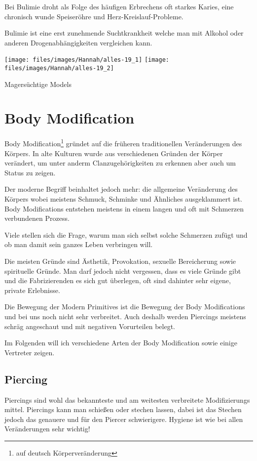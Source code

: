 Bei Bulimie droht als Folge des häufigen Erbrechens oft starkes Karies, eine chronisch wunde
Speiseröhre und Herz-Kreislauf-Probleme.

Bulimie ist eine erst zunehmende Suchtkrankheit welche man mit Alkohol oder anderen
Drogenabhängigkeiten vergleichen kann.

\begin{figurewrapper}
	\subfigure%
		{\texttt{[image: files/images/Hannah/alles-19\_1]}} \hfill
	\subfigure%
		{\texttt{[image: files/images/Hannah/alles-19\_2]}}%
	\caption{Magersüchtige Models}
\end{figurewrapper}


\section{Body Modification}
Body Modification\footnote{auf deutsch Körperveränderung} gründet auf die früheren traditionellen
Veränderungen des Körpers. In alte Kulturen wurde aus verschiedenen Gründen der Körper verändert, um
unter anderm Clanzugehörigkeiten zu erkennen aber auch um Status zu zeigen.

Der moderne Begriff beinhaltet jedoch mehr: die allgemeine Veränderung des Körpers wobei meistens
Schmuck, Schminke und Ähnliches ausgeklammert ist. Body Modifications entstehen meistens in einem
langen und oft mit Schmerzen verbundenen Prozess.

Viele stellen sich die Frage, warum man sich selbst solche Schmerzen zufügt und ob man damit sein
ganzes Leben verbringen will.

Die meisten Gründe sind Ästhetik, Provokation, sexuelle Bereicherung sowie spirituelle Gründe. Man
darf jedoch nicht vergessen, dass es viele Gründe gibt und die Fabrizierenden es sich gut überlegen,
oft sind dahinter sehr eigene, private Erlebnisse.

Die Bewegung der Modern Primitives ist die Bewegung der Body Modifications und bei uns noch nicht
sehr verbreitet. Auch deshalb werden Piercings meistens schräg angeschaut und mit negativen
Vorurteilen belegt.

Im Folgenden will ich verschiedene Arten der Body Modification sowie einige Vertreter zeigen.

\subsection{Piercing}
Piercings sind wohl das bekannteste und am weitesten verbreitete Modifizierungs mittel. Piercings
kann man schießen oder stechen lassen, dabei ist das Stechen jedoch das genauere und für den Piercer
schwierigere. Hygiene ist wie bei allen Veränderungen sehr wichtig!


